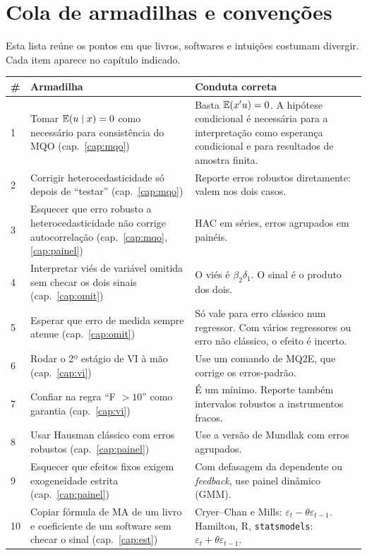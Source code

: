 \chapter{Cola de armadilhas e convenções}
\label{cap:cola}

Esta lista reúne os pontos em que livros, softwares e intuições costumam divergir. Cada item aparece no capítulo indicado.

\begin{center}
\small
\begin{longtable}{p{0.5cm}p{6.6cm}p{6.5cm}}
\toprule
\textbf{\#} & \textbf{Armadilha} & \textbf{Conduta correta} \\
\midrule
\endhead
1 & Tomar $\mathbb{E}(u\mid x)=0$ como necessário para consistência do MQO (cap.~\ref{cap:mqo}) & Basta $\mathbb{E}(x'u)=0$. A hipótese condicional é necessária para a interpretação como esperança condicional e para resultados de amostra finita. \\
2 & Corrigir heterocedasticidade só depois de ``testar'' (cap.~\ref{cap:mqo}) & Reporte erros robustos diretamente: valem nos dois casos. \\
3 & Esquecer que erro robusto a heterocedasticidade não corrige autocorrelação (cap.~\ref{cap:mqo}, \ref{cap:painel}) & HAC em séries, erros agrupados em painéis. \\
4 & Interpretar viés de variável omitida sem checar os dois sinais (cap.~\ref{cap:omit}) & O viés é $\beta_2\delta_1$. O sinal é o produto dos dois. \\
5 & Esperar que erro de medida sempre atenue (cap.~\ref{cap:omit}) & Só vale para erro clássico num regressor. Com vários regressores ou erro não clássico, o efeito é incerto. \\
6 & Rodar o 2º estágio de VI à mão (cap.~\ref{cap:vi}) & Use um comando de MQ2E, que corrige os erros-padrão. \\
7 & Confiar na regra ``F $>10$'' como garantia (cap.~\ref{cap:vi}) & É um mínimo. Reporte também intervalos robustos a instrumentos fracos. \\
8 & Usar Hausman clássico com erros robustos (cap.~\ref{cap:painel}) & Use a versão de Mundlak com erros agrupados. \\
9 & Esquecer que efeitos fixos exigem exogeneidade estrita (cap.~\ref{cap:painel}) & Com defasagem da dependente ou \emph{feedback}, use painel dinâmico (GMM). \\
10 & Copiar fórmula de MA de um livro e coeficiente de um software sem checar o sinal (cap.~\ref{cap:est}) & Cryer--Chan e Mills: $\varepsilon_t-\theta\varepsilon_{t-1}$. Hamilton, R, \texttt{statsmodels}: $\varepsilon_t+\theta\varepsilon_{t-1}$. \\

\end{longtable}
\end{center}
